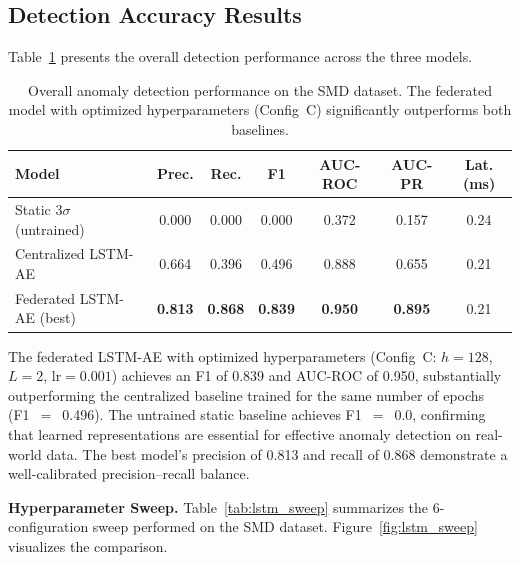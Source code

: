 \subsection{Detection Accuracy Results}
\label{subsec:eval_detection_results}

Table~\ref{tab:detection_results} presents the overall detection performance
across the three models.

\begin{table}[H]
    \centering
    \begin{tabular}{|l|c|c|c|c|c|c|}
        \hline
        \textbf{Model} & \textbf{Prec.} & \textbf{Rec.} & \textbf{F1}
        & \textbf{AUC-ROC} & \textbf{AUC-PR} & \textbf{Lat. (ms)} \\
        \hline
        Static 3$\sigma$ (untrained) & 0.000 & 0.000 & 0.000 & 0.372 & 0.157 & 0.24 \\
        \hline
        Centralized LSTM-AE & 0.664 & 0.396 & 0.496 & 0.888 & 0.655 & 0.21 \\
        \hline
        Federated LSTM-AE (best) & \textbf{0.813} & \textbf{0.868} & \textbf{0.839} & \textbf{0.950} & \textbf{0.895} & 0.21 \\
        \hline
    \end{tabular}
    \caption{Overall anomaly detection performance on the SMD dataset.
             The federated model with optimized hyperparameters (Config~C)
             significantly outperforms both baselines.}
    \label{tab:detection_results}
\end{table}

The federated LSTM-AE with optimized hyperparameters (Config~C: $h{=}128$,
$L{=}2$, $\text{lr}{=}0.001$) achieves an F1 of 0.839 and AUC-ROC of 0.950,
substantially outperforming the centralized baseline trained for the same
number of epochs (F1~$=$~0.496). The untrained static baseline achieves
F1~$=$~0.0, confirming that learned representations are essential for
effective anomaly detection on real-world data. The best model's precision
of 0.813 and recall of 0.868 demonstrate a well-calibrated
precision--recall balance.

\textbf{Hyperparameter Sweep.} Table~\ref{tab:lstm_sweep} summarizes the
6-configuration sweep performed on the SMD dataset.
Figure~\ref{fig:lstm_sweep} visualizes the comparison.

